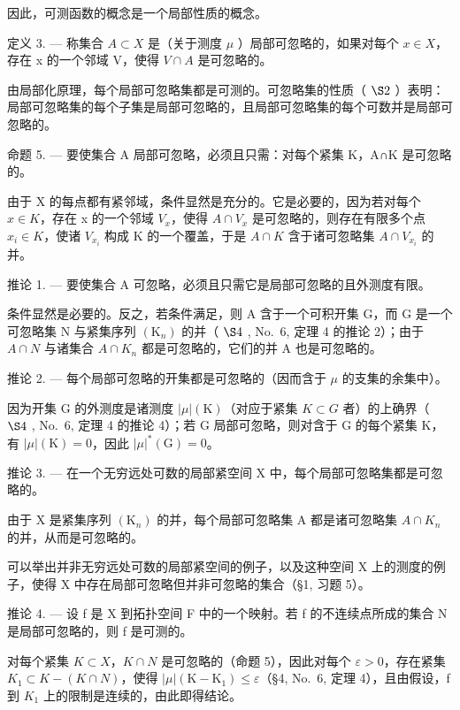 因此，可测函数的概念是一个局部性质的概念。

定义 3. --- 称集合 \(A \subset X\) 是（关于测度 \(\mu\) ）局部可忽略的，如果对每个 \(x \in X\)，存在 x 的一个邻域 V，使得 \(V \cap A\) 是可忽略的。

由局部化原理，每个局部可忽略集都是可测的。可忽略集的性质（ \(\S2\) ）表明：局部可忽略集的每个子集是局部可忽略的，且局部可忽略集的每个可数并是局部可忽略的。

命题 5. --- 要使集合 A 局部可忽略，必须且只需：对每个紧集 K，A∩K 是可忽略的。

由于 X 的每点都有紧邻域，条件显然是充分的。它是必要的，因为若对每个 \(x \in K\)，存在 x 的一个邻域 \(V_{x}\)，使得 \(A \cap V_{x}\) 是可忽略的，则存在有限多个点 \(x_{i} \in K\)，使诸 \(V_{x_{i}}\) 构成 K 的一个覆盖，于是 \(A \cap K\) 含于诸可忽略集 \(A \cap V_{x_{i}}\) 的并。

推论 1. --- 要使集合 A 可忽略，必须且只需它是局部可忽略的且外测度有限。

条件显然是必要的。反之，若条件满足，则 A 含于一个可积开集 G，而 G 是一个可忽略集 N 与紧集序列 \((\mathrm{K}_{n})\) 的并（ \(\S4\) , No.~6, 定理 4 的推论 2）；由于 \(A \cap N\) 与诸集合 \(A \cap K_{n}\) 都是可忽略的，它们的并 A 也是可忽略的。

推论 2. --- 每个局部可忽略的开集都是可忽略的（因而含于 \(\mu\) 的支集的余集中）。

因为开集 G 的外测度是诸测度 \(|\mu|(\mathrm{K})\)（对应于紧集 \(K \subset G\) 者）的上确界（ \(\S4\) , No.~6, 定理 4 的推论 4）；若 G 局部可忽略，则对含于 G 的每个紧集 K，有 \(|\mu|(\mathrm{K}) = 0\)，因此 \(|\mu|^{*}(\mathrm{G}) = 0\)。

推论 3. --- 在一个无穷远处可数的局部紧空间 X 中，每个局部可忽略集都是可忽略的。

由于 X 是紧集序列 \((\mathrm{K}_{n})\) 的并，每个局部可忽略集 A 都是诸可忽略集 \(A\cap K_{n}\) 的并，从而是可忽略的。

可以举出并非无穷远处可数的局部紧空间的例子，以及这种空间 X 上的测度的例子，使得 X 中存在局部可忽略但并非可忽略的集合（§1, 习题 5）。

推论 4. --- 设 f 是 X 到拓扑空间 F 中的一个映射。若 f 的不连续点所成的集合 N 是局部可忽略的，则 f 是可测的。

对每个紧集 \(K \subset X\)，\(K \cap N\) 是可忽略的（命题 5），因此对每个 \(\varepsilon > 0\)，存在紧集 \(K_{1} \subset K - (K \cap N)\)，使得 \(|\mu|(\mathrm{K} - \mathrm{K}_{1}) \leqslant \varepsilon\)（§4, No.~6, 定理 4），且由假设，f 到 \(K_{1}\) 上的限制是连续的，由此即得结论。

